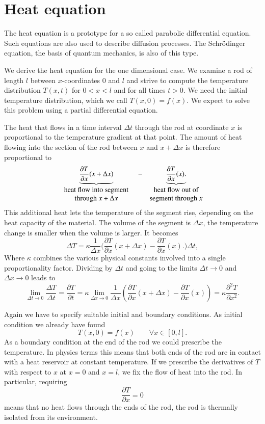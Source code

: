 %
%
%
\section{Heat equation}
The heat equation is a prototype for a so called parabolic differential
equation.
Such equations are also used to describe diffusion processes.
The Schrödinger equation, the basis of quantum mechanics, is also of this type.

We derive the heat equation for the one dimensional case.
We examine a rod of length $l$ between $x$-coordinates $0$ and $l$
and strive to compute the temperature distribution $T(x,t)$ for 
$0<x<l$ and for all times $t>0$.
We need the initial temperature distribution, which we call
$T(x,0) = f(x)$.
We expect to solve this problem using a partial differential equation.

The heat that flows in a time interval $\Delta t$ through the rod at
coordinate $x$ is proportional to the temperature gradient at that point.
The amount of heat flowing into the section  of the rod between
$x$ and $x+\Delta x$ is therefore proportional to
\[
\underbrace{
\frac{\partial T}{\partial x}(x+\Delta x)}
_{\parbox{4cm}{\raggedright\centering heat flow into segment through $x+\Delta x$}}
-
\underbrace{\frac{\partial T}{\partial x}(x).}_{\parbox{3.2cm}{\raggedright
\centering
heat flow out of segment through $x$}}
\]
This additional heat lets the temperature of the segment rise, depending
on the heat capacity of the material.
The volume of the segment is $\Delta x$, the temperature change is smaller
when the volume is larger.
It becomes
\[
\Delta T
=
\kappa
\frac{1}{\Delta x}
\biggl(
\frac{\partial T}{\partial x}(x+\Delta x)-\frac{\partial T}{\partial x}(x).
\biggr) \Delta t,
\]
Where $\kappa$ combines the various physical constants involved into
a single proportionality factor.
Dividing by $\Delta t$ and going to the limits $\Delta t\to 0$
and $\Delta x\to 0$ leads to
\begin{equation}
\lim_{\Delta t\to 0}\frac{\Delta T}{\Delta t}
=
\frac{\partial T}{\partial t}
=
\kappa
\lim_{\Delta x\to 0}\frac1{\Delta x}\left(\frac{\partial T}{\partial x}(x+\Delta x)-\frac{\partial T}{\partial x}(x)\right)
=\kappa\frac{\partial^2T}{\partial x^2}.
\label{examples:heat-equation}
\end{equation}

Again we have to specify suitable initial and boundary conditions.
As initial condition we already have found
\[
T(x,0)=f(x)\qquad \forall x\in[0,l].
\]
As a boundary condition at the end of the rod we could prescribe the
temperature.
In physics terms this means that both ends of the rod are in contact
with a heat reservoir at constant temperature.
If we prescribe the derivatives of $T$ with respect to $x$ at $x=0$ and
$x=l$, we fix the flow of heat into the rod.
In particular, requiring
\[
\frac{\partial T}{\partial x} = 0
\]
means that no heat flows through the ends of the rod, the rod is
thermally isolated from its environment.

